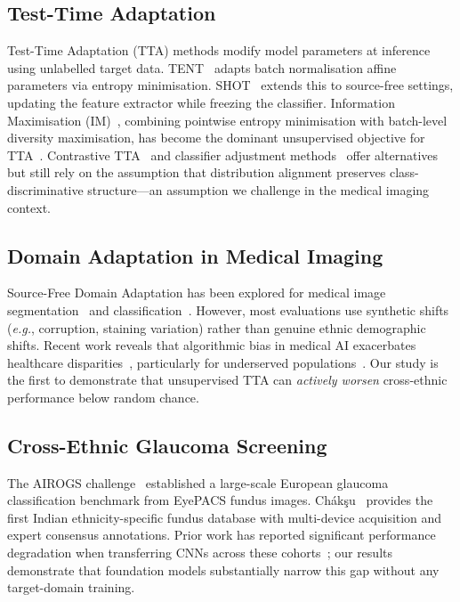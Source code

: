 \documentclass[11pt,twocolumn]{article}
\newcommand{\eg}{\emph{e.g.}}
\begin{document}
\subsection{Test-Time Adaptation}
Test-Time Adaptation (TTA) methods modify model parameters at inference using unlabelled target data. TENT~\citep{wang2021tent} adapts batch normalisation affine parameters via entropy minimisation. SHOT~\citep{liang2020shot} extends this to source-free settings, updating the feature extractor while freezing the classifier. Information Maximisation (IM)~\citep{krause2010discriminative}, combining pointwise entropy minimisation with batch-level diversity maximisation, has become the dominant unsupervised objective for TTA~\citep{liang2022imbalanced}. Contrastive TTA~\citep{chen2022contrastive} and classifier adjustment methods~\citep{iwasawa2021ttt} offer alternatives but still rely on the assumption that distribution alignment preserves class-discriminative structure---an assumption we challenge in the medical imaging context.

\subsection{Domain Adaptation in Medical Imaging}
Source-Free Domain Adaptation has been explored for medical image segmentation~\citep{bateson2022sfda} and classification~\citep{yang2024tta_medical}. However, most evaluations use synthetic shifts (\eg, corruption, staining variation) rather than genuine ethnic demographic shifts. Recent work reveals that algorithmic bias in medical AI exacerbates healthcare disparities~\citep{obermeyer2019dissecting, seyyed2021underdiagnosis}, particularly for underserved populations~\citep{chen2021ethical}. Our study is the first to demonstrate that unsupervised TTA can \emph{actively worsen} cross-ethnic performance below random chance.

\subsection{Cross-Ethnic Glaucoma Screening}
The AIROGS challenge~\citep{vermeer2024airogs} established a large-scale European glaucoma classification benchmark from EyePACS fundus images. Ch\'{a}k\c{s}u~\citep{kumar2023chakshu} provides the first Indian ethnicity-specific fundus database with multi-device acquisition and expert consensus annotations. Prior work has reported significant performance degradation when transferring CNNs across these cohorts~\citep{rajesh2025rps}; our results demonstrate that foundation models substantially narrow this gap without any target-domain training.
\end{document}
